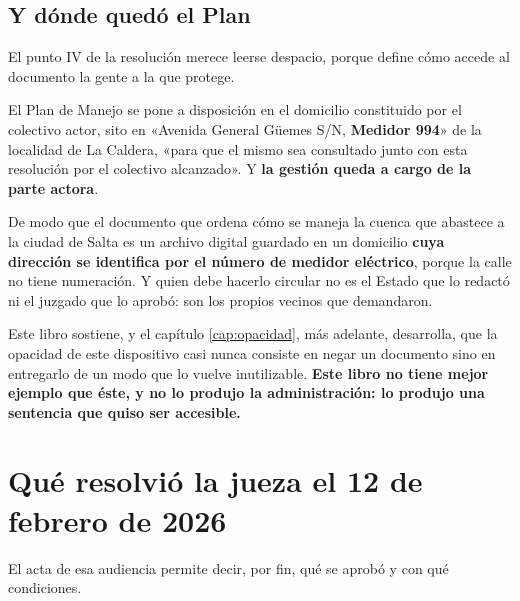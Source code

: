 \subsection*{Y dónde quedó el Plan}

El punto IV de la resolución merece leerse despacio, porque define cómo accede al documento
la gente a la que protege.

El Plan de Manejo se pone a disposición en el domicilio constituido por el colectivo actor, sito en «Avenida General Güemes S/N, \textbf{Medidor 994}» de
la localidad de La Caldera, «para que el mismo sea consultado junto con esta resolución por el
colectivo alcanzado». Y \textbf{la gestión queda a cargo de la parte actora}.

De modo que el documento que ordena cómo se maneja la cuenca que abastece a la ciudad de
Salta es un archivo digital guardado en un domicilio \textbf{cuya dirección se
identifica por el número de medidor eléctrico}, porque la calle no tiene numeración. Y quien
debe hacerlo circular no es el Estado que lo redactó ni el juzgado que lo aprobó: son los
propios vecinos que demandaron.

Este libro sostiene, y el capítulo \ref{cap:opacidad}, más adelante, desarrolla, que la opacidad de este dispositivo casi nunca
consiste en negar un documento sino en entregarlo de un modo que lo vuelve inutilizable.
\textbf{Este libro no tiene mejor ejemplo que éste, y no lo produjo la administración: lo produjo una
sentencia que quiso ser accesible.}

\section{Qué resolvió la jueza el 12 de febrero de 2026}

El acta de esa audiencia permite decir, por fin, qué se aprobó y con qué condiciones.

